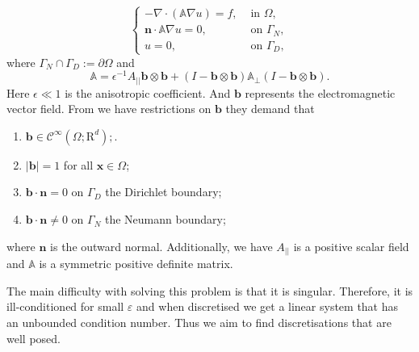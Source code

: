 \documentclass[12pt]{ociamthesis}
\begin{document}
\begin{equation} \label{PDE}
\begin{cases}
-\nabla \cdot (\mathbb{A}\nabla u) = f, & \text{ in }\Omega,\\
\mathbf{n}\cdot \mathbb{A}\nabla u = 0, & \text{ on }\Gamma_N, \\
u = 0, & \text{  on }\Gamma_D,
\end{cases}
\end{equation}
where $\Gamma_N \cap \Gamma_D := \partial \Omega$ and
\begin{equation} \label{Mat_A}
\mathbb{A} = \epsilon^{-1} A_{||}\mathbf{b}\otimes \mathbf{b}
+(I - \mathbf{b}\otimes \mathbf{b})\mathbb{A}_{\perp}
(I - \mathbf{b}\otimes \mathbf{b}).
\end{equation}
    Here $\epsilon \ll 1$ is the anisotropic coefficient. And $\mathbf{b}$ represents the electromagnetic vector field. From \cite{DN} we have restrictions on $\mathbf{b}$ they demand that
    \begin{enumerate}
  \item $\mathbf{b} \in \mathcal{C}^{\infty}(\Omega; \mathrm{R}^d);$.
  \item $|\mathbf{b}|=1$ for all $\mathbf{x} \in \Omega$;
  \item $\mathbf{b}\cdot \mathbf{n} = 0$ on $\Gamma_D$ the Dirichlet boundary;
  \item $\mathbf{b}\cdot \mathbf{n} \neq 0$ on $\Gamma_N$ the Neumann boundary;
\end{enumerate}
where $\mathbf{n}$ is the outward normal. Additionally, we have  $A_{||}$ is a positive scalar field and $\mathbb{A}$ is a symmetric positive definite matrix.

The main difficulty with solving this problem is that it is singular. Therefore, it is ill-conditioned for small $\varepsilon$ and when discretised we get a linear system that has an unbounded condition number. Thus we aim to find discretisations that are well posed.  
\end{document}
